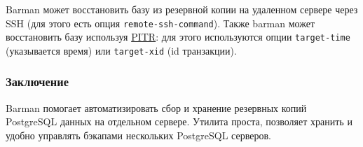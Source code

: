 Barman может восстановить базу из резервной копии на удаленном сервере через SSH (для этого есть опция \lstinline!remote-ssh-command!). Также barman может восстановить базу используя \href{http://en.wikipedia.org/wiki/Point-in-time\_recovery}{PITR}: для этого используются опции \lstinline!target-time! (указывается время) или \lstinline!target-xid! (id транзакции).

\subsubsection{Заключение}

Barman помогает автоматизировать сбор и хранение резервных копий PostgreSQL данных на отдельном сервере. Утилита проста, позволяет хранить и удобно управлять бэкапами нескольких PostgreSQL серверов.